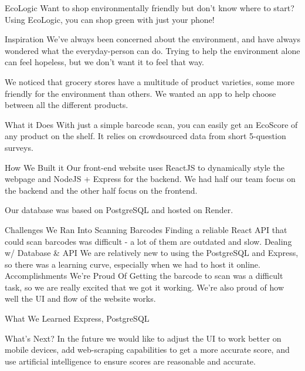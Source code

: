 EcoLogic
Want to shop environmentally friendly but don't know where to start? Using EcoLogic, you can shop green with just your phone!

Inspiration
We've always been concerned about the environment, and have always wondered what the everyday-person can do. Trying to help the environment alone can feel hopeless, but we don't want it to feel that way.

We noticed that grocery stores have a multitude of product varieties, some more friendly for the environment than others. We wanted an app to help choose between all the different products.

What it Does
With just a simple barcode scan, you can easily get an EcoScore of any product on the shelf. It relies on crowdsourced data from short 5-question surveys.

How We Built it
Our front-end website uses ReactJS to dynamically style the webpage and NodeJS + Express for the backend. We had half our team focus on the backend and the other half focus on the frontend.

Our database was based on PostgreSQL and hosted on Render.

Challenges We Ran Into
Scanning Barcodes
Finding a reliable React API that could scan barcodes was difficult - a lot of them are outdated and slow.
Dealing w/ Database & API
We are relatively new to using the PostgreSQL and Express, so there was a learning curve, especially when we had to host it online.
Accomplishments We're Proud Of
Getting the barcode to scan was a difficult task, so we are really excited that we got it working. We're also proud of how well the UI and flow of the website works.

What We Learned
Express, PostgreSQL

What's Next?
In the future we would like to adjust the UI to work better on mobile devices, add web-scraping capabilities to get a more accurate score, and use artificial intelligence to ensure scores are reasonable and accurate.
